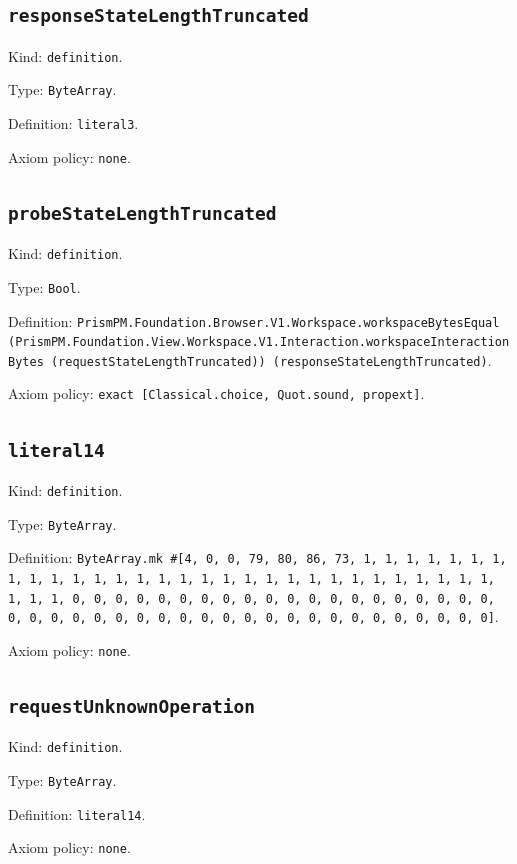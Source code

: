 \documentclass[11pt]{article}
\begin{document}
\subsection*{\texttt{responseStateLengthTruncated}}
\noindent Kind: \texttt{definition}.\par
\noindent Type: \texttt{ByteArray}.\par
\noindent Definition: \texttt{literal3}.\par
\noindent Axiom policy: \texttt{none}.\par
\subsection*{\texttt{probeStateLengthTruncated}}
\noindent Kind: \texttt{definition}.\par
\noindent Type: \texttt{Bool}.\par
\noindent Definition: \texttt{PrismPM.Foundation.Browser.V1.Workspace.workspaceBytesEqual (PrismPM.Foundation.View.Workspace.V1.Interaction.workspaceInteractionBytes (requestStateLengthTruncated)) (responseStateLengthTruncated)}.\par
\noindent Axiom policy: \texttt{exact [Classical.choice, Quot.sound, propext]}.\par
\subsection*{\texttt{literal14}}
\noindent Kind: \texttt{definition}.\par
\noindent Type: \texttt{ByteArray}.\par
\noindent Definition: \texttt{ByteArray.mk \#[4, 0, 0, 79, 80, 86, 73, 1, 1, 1, 1, 1, 1, 1, 1, 1, 1, 1, 1, 1, 1, 1, 1, 1, 1, 1, 1, 1, 1, 1, 1, 1, 1, 1, 1, 1, 1, 1, 1, 1, 0, 0, 0, 0, 0, 0, 0, 0, 0, 0, 0, 0, 0, 0, 0, 0, 0, 0, 0, 0, 0, 0, 0, 0, 0, 0, 0, 0, 0, 0, 0, 0, 0, 0, 0, 0, 0, 0, 0, 0, 0, 0, 0]}.\par
\noindent Axiom policy: \texttt{none}.\par
\subsection*{\texttt{requestUnknownOperation}}
\noindent Kind: \texttt{definition}.\par
\noindent Type: \texttt{ByteArray}.\par
\noindent Definition: \texttt{literal14}.\par
\noindent Axiom policy: \texttt{none}.\par
\end{document}
